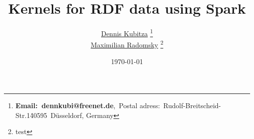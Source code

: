 
\title{Kernels for RDF data using Spark}

\author{\href{https://github.com/DennisKubitza}{Dennis Kubitza} \thanks{\textbf{Email:\ denn\textunderscore kubi@freenet.de},\ Postal adress:\ Rudolf-Breitscheid-Str.1\. 40595\ D\"usseldorf, Germany} \\ \href{https://github.com/pelmeshk0}{Maximilian Radomsky} \thanks{test}}
\date{\today}

